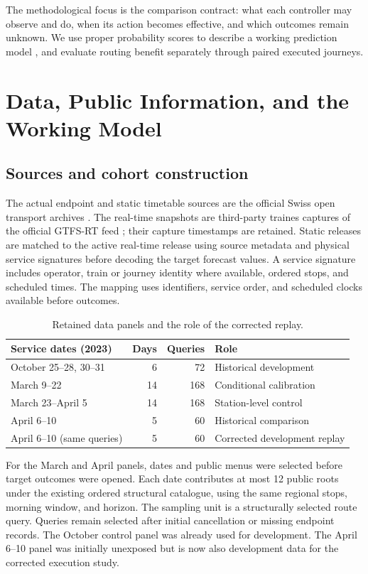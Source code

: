 \documentclass[preprint,12pt,authoryear]{elsarticle}
\begin{document}
The methodological focus is the comparison contract: what each controller may
observe and do, when its action becomes effective, and which outcomes remain
unknown. We use proper probability scores to describe a working prediction
model \citep{gneiting2007}, and evaluate routing benefit separately through
paired executed journeys.

\section{Data, Public Information, and the Working Model}
\subsection{Sources and cohort construction}
The actual endpoint and static timetable sources are the official Swiss open
transport archives \citep{swissactual}. The real-time snapshots are third-party
traines captures of the official GTFS-RT feed \citep{traines}; their capture
timestamps are retained. Static releases are matched to the active real-time
release using source metadata and physical service signatures before decoding
the target forecast values. A service signature includes operator, train or
journey identity where available, ordered stops, and scheduled times. The mapping
uses identifiers, service order, and scheduled clocks available before outcomes.

\begin{table}[ht]
\centering\small\setlength{\tabcolsep}{4pt}
\caption{Retained data panels and the role of the corrected replay.}
\begin{tabular}{lrrp{}}
\toprule
Service dates (2023) & Days & Queries & Role \\
\midrule
October 25--28, 30--31 & 6 & 72 & Historical development \\
March 9--22 & 14 & 168 & Conditional calibration \\
March 23--April 5 & 14 & 168 & Station-level control \\
April 6--10 & 5 & 60 & Historical comparison \\
April 6--10 (same queries) & 5 & 60 & Corrected development replay \\
\bottomrule
\end{tabular}
\end{table}

For the March and April panels, dates and public menus were selected before
target outcomes were opened. Each date contributes at most 12 public roots
under the existing ordered structural catalogue, using the same regional stops,
morning window, and horizon. The sampling unit is a structurally selected route
query. Queries remain selected after initial cancellation or missing endpoint
records. The October control
panel was already used for development. The April 6--10 panel was initially
unexposed but is now also development data for the corrected execution study.
\end{document}
